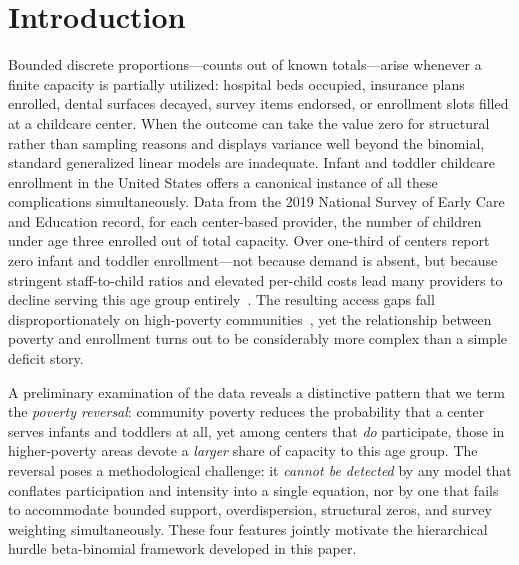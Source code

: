 
\section{Introduction}
\label{sec:intro}


Bounded discrete proportions---counts out of known totals---arise
whenever a finite capacity is partially utilized: hospital beds
occupied, insurance plans enrolled, dental surfaces decayed, survey
items endorsed, or enrollment slots filled at a childcare center.  When the outcome can take the value zero for
structural rather than sampling reasons and displays variance well
beyond the binomial, standard generalized linear models are inadequate.
Infant and toddler childcare enrollment in the United States offers a
canonical instance of all these complications simultaneously.  Data from
the 2019 National Survey of Early Care and Education
\citep{NSECEProjectTeam2022} record, for each center-based provider,
the number of children under age three enrolled out of total capacity.
Over one-third of centers report zero infant and toddler enrollment---not
because demand is absent, but because stringent staff-to-child ratios and
elevated per-child costs lead many providers to decline serving this age
group entirely~\citep{AdamsRohacek2010}.  The resulting access gaps fall
disproportionately on high-poverty
communities~\citep{DobbinsEtAl2016, MalikEtAl2018}, yet the relationship
between poverty and enrollment turns out to be considerably more complex
than a simple deficit story.


A preliminary examination of the data reveals a distinctive pattern that we
term the \emph{poverty reversal}: community poverty reduces the
probability that a center serves infants and toddlers at all, yet among
centers that \emph{do} participate, those in higher-poverty areas devote
a \emph{larger} share of capacity to this age group.
The reversal poses a methodological challenge: it \emph{cannot be detected} by any model
that conflates participation and intensity into a single equation, nor
by one that fails to accommodate bounded support, overdispersion,
structural zeros, and survey weighting simultaneously.  These four
features jointly motivate the hierarchical hurdle beta-binomial
framework developed in this paper.


